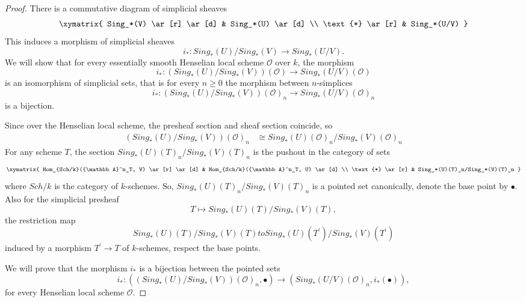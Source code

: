 \documentclass[11pt, reqno]{amsart}
\theoremstyle{plain}
\theoremstyle{definition}
\newcommand{\Spec}{{\rm Spec \,}}
\newcommand{\sO}{{\mathcal O}}
\newcommand{\A}{{\mathbb A}}
\begin{document}
\begin{proof}
There is a commutative diagram of simplicial sheaves
  \[
\xymatrix{
Sing_*(V) \ar[r] \ar[d] & Sing_*(U) \ar[d] \\
\text{*} \ar[r] & Sing_*(U/V)
}
\]
This induces a morphism of simplicial sheaves
$$i_*: Sing_*(U)/Sing_*(V) \to Sing_*(U/V).$$
We will show that for every essentially smooth Henselian local scheme $\mathcal{O}$ over $k$, the morphism
$$i_*: (Sing_*(U)/Sing_*(V))(\mathcal{O}) \to Sing_*(U/V)(\mathcal{O})$$
is an isomorphism of simplicial sets, that is for every $n \geq 0$ the morphism between $n$-simplices
$$i_*: (Sing_*(U)/Sing_*(V))(\mathcal{O})_n \to Sing_*(U/V)(\mathcal{O})_n$$
is a bijection.

Since over the Henselian local scheme, the presheaf section and sheaf section coincide, so
\begin{align*}
(Sing_*(U)/Sing_*(V))(\mathcal{O})_n & \cong Sing_*(U)(\sO)_n/Sing_*(V)(\sO)_n
\end{align*}
For any scheme $T$, the section $Sing_*(U)(T)_n/Sing_*(V)(T)_n$ is the pushout in the category of sets
 \[
\xymatrix{
Hom_{Sch/k}(\A^n_T, V) \ar[r] \ar[d] & Hom_{Sch/k}(\A^n_T, U) \ar[d] \\
\text{*} \ar[r] & Sing_*(U)(T)_n/Sing_*(V)(T)_n
}
\]
where $Sch/k$ is the category of $k$-schemes. So, $Sing_*(U)(T)_n/Sing_*(V)(T)_n$ is a pointed set canonically, denote the base point by $\bullet$. Also for the simplicial presheaf 
$$T \mapsto Sing_*(U)(T)/Sing_*(V)(T),$$
the restriction map
$$Sing_*(U)(T)/Sing_*(V)(T) to Sing_*(U)(T^\prime)/Sing_*(V)(T^\prime)$$
induced by a morphism $T^\prime \to T$ of $k$-schemes, respect the base points.

We will prove that the morphism  $i_*$ is a bijection between the pointed sets
$$i_*: ((Sing_*(U)/Sing_*(V))(\mathcal{O})_n, \bullet) \to (Sing_*(U/V)(\mathcal{O})_n, i_*(\bullet)),$$
for every Henselian local scheme $\sO$.




\end{proof}
\end{document}
